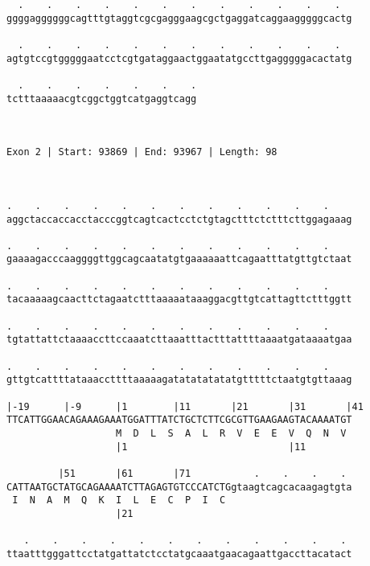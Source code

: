 \documentclass{article}
\begin{document}
\begin{Verbatim}
  .    .    .    .    .    .    .    .    .    .    .    .  
ggggaggggggcagtttgtaggtcgcgagggaagcgctgaggatcaggaagggggcactg
                                                            
  .    .    .    .    .    .    .    .    .    .    .    .  
agtgtccgtgggggaatcctcgtgataggaactggaatatgccttgagggggacactatg
                                                            
  .    .    .    .    .    .    .
tctttaaaaacgtcggctggtcatgaggtcagg
                                 
                                 
 
Exon 2 | Start: 93869 | End: 93967 | Length: 98



.    .    .    .    .    .    .    .    .    .    .    .    
aggctaccaccacctacccggtcagtcactcctctgtagctttctctttcttggagaaag
                                                            
.    .    .    .    .    .    .    .    .    .    .    .    
gaaaagacccaaggggttggcagcaatatgtgaaaaaattcagaatttatgttgtctaat
                                                            
.    .    .    .    .    .    .    .    .    .    .    .    
tacaaaaagcaacttctagaatctttaaaaataaaggacgttgtcattagttctttggtt
                                                            
.    .    .    .    .    .    .    .    .    .    .    .    
tgtattattctaaaaccttccaaatcttaaatttactttattttaaaatgataaaatgaa
                                                            
.    .    .    .    .    .    .    .    .    .    .    .    
gttgtcattttataaaccttttaaaaagatatatatatatgtttttctaatgtgttaaag
                                                            
|-19      |-9      |1        |11       |21       |31       |41
TTCATTGGAACAGAAAGAAATGGATTTATCTGCTCTTCGCGTTGAAGAAGTACAAAATGT
                   M  D  L  S  A  L  R  V  E  E  V  Q  N  V 
                   |1                            |11        
  
         |51       |61       |71           .    .    .    . 
CATTAATGCTATGCAGAAAATCTTAGAGTGTCCCATCTGgtaagtcagcacaagagtgta
 I  N  A  M  Q  K  I  L  E  C  P  I  C                      
                   |21                                      
  
   .    .    .    .    .    .    .    .    .    .    .    . 
ttaatttgggattcctatgattatctcctatgcaaatgaacagaattgaccttacatact
                                                            

\end{Verbatim}
\end{document}
